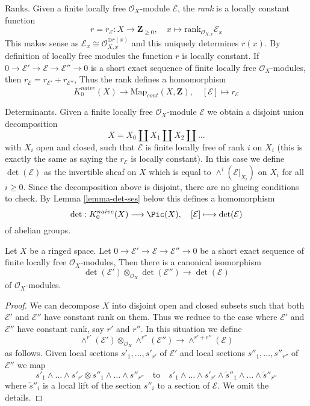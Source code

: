 \medskip\noindent
Ranks. Given a finite locally free $\mathcal{O}_X$-module $\mathcal{E}$,
the {\it rank} is a locally constant function
$$
r = r_\mathcal{E} : X \longrightarrow \mathbf{Z}_{\geq 0},\quad
x \longmapsto \text{rank}_{\mathcal{O}_{X, x}} \mathcal{E}_x
$$
This makes sense as $\mathcal{E}_x \cong \mathcal{O}_{X, x}^{\oplus r(x)}$
and this uniquely determines $r(x)$. By definition of locally free
modules the function $r$ is locally constant. If 
$0 \to \mathcal{E}' \to \mathcal{E} \to \mathcal{E}'' \to 0$
is a short exact sequence of finite locally free $\mathcal{O}_X$-modules,
then $r_\mathcal{E} = r_{\mathcal{E}'} + r_{\mathcal{E}''}$,
Thus the rank defines a homomorphism
$$
K_0^{naive}(X) \longrightarrow \text{Map}_{cont}(X, \mathbf{Z}),\quad
[\mathcal{E}] \longmapsto r_\mathcal{E}
$$

\medskip\noindent
Determinants. Given a  finite locally free
$\mathcal{O}_X$-module $\mathcal{E}$ we obtain a disjoint union
decomposition
$$
X = X_0 \amalg X_1 \amalg X_2 \amalg \ldots
$$
with $X_i$ open and closed, such that $\mathcal{E}$ is finite locally
free of rank $i$ on $X_i$ (this is exactly the same as saying the
$r_\mathcal{E}$ is locally constant). In this case we define
$\det(\mathcal{E})$ as the invertible sheaf on $X$ which is equal to
$\wedge^i(\mathcal{E}|_{X_i})$ on $X_i$ for all $i \geq 0$.
Since the decomposition above is disjoint, there are no glueing
conditions to check. By Lemma \ref{lemma-det-ses} below
this defines a homomorphism
$$
\det : K_0^{naive}(X) \longrightarrow \Pic(X),\quad
[\mathcal{E}] \longmapsto \det(\mathcal{E})
$$
of abelian groups.

\begin{lemma}
\label{lemma-det-ses}
Let $X$ be a ringed space. Let
$0 \to \mathcal{E}' \to \mathcal{E} \to \mathcal{E}'' \to 0$
be a short exact sequence of finite locally free $\mathcal{O}_X$-modules,
Then there is a canonical isomorphism
$$
\det(\mathcal{E}') \otimes_{\mathcal{O}_X}\det(\mathcal{E}'')
\longrightarrow
\det(\mathcal{E})
$$
of $\mathcal{O}_X$-modules.
\end{lemma}

\begin{proof}
We can decompose $X$ into disjoint open and closed subsets such that
both $\mathcal{E}'$ and $\mathcal{E}''$ have constant rank on them.
Thus we reduce to the case where $\mathcal{E}'$ and $\mathcal{E}''$
have constant rank, say $r'$ and $r''$. In this situation we
define
$$
\wedge^{r'}(\mathcal{E}') \otimes_{\mathcal{O}_X} \wedge^{r''}(\mathcal{E}'')
\longrightarrow
\wedge^{r' + r''}(\mathcal{E})
$$
as follows. Given local sections $s'_1, \ldots, s'_{r'}$ of $\mathcal{E}'$
and local sections $s''_1, \ldots, s''_{r''}$ of $\mathcal{E}''$
we map
$$
s'_1 \wedge \ldots \wedge s'_{r'} \otimes
s''_1 \wedge \ldots \wedge s''_{r''}
\quad\text{to}\quad
s'_1 \wedge \ldots \wedge s'_{r'} \wedge
\tilde s''_1 \wedge \ldots \wedge \tilde s''_{r''}
$$
where $\tilde s''_i$ is a local lift of the section
$s''_i$ to a section of $\mathcal{E}$. We omit the details.
\end{proof}






